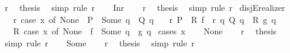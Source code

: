 \begin{isabellebody}
\ r\ \isamarkupfalse%
\ {\isacharquery}{\kern0pt}thesis\ \isamarkupfalse%
\ simp\ {\isacharparenleft}{\kern0pt}rule\ r{}{\isacharparenright}{\kern0pt}\isanewline
{}\isamarkupfalse%
\isanewline
\ \ \isamarkupfalse%
\ Inr\isanewline
\ \ \isamarkupfalse%
\ r\ \isamarkupfalse%
\ {\isacharquery}{\kern0pt}thesis\ \isamarkupfalse%
\ simp\ {\isacharparenleft}{\kern0pt}rule\ r{}{\isacharparenright}{\kern0pt}\isanewline
{}\isamarkupfalse%
%
\endisatagproof
{\isafoldproof}%
%
\isadelimproof
\isanewline
%
\endisadelimproof
\isanewline
{}\isamarkupfalse%
\ disjE{\isacharunderscore}{\kern0pt}realizer{}{\isacharcolon}{\kern0pt}\isanewline
\ \ \ r{\isacharcolon}{\kern0pt}\ {\isachardoublequoteopen}case\ x\ of\ None\ {\isasymRightarrow}\ P\ {\isacharbar}{\kern0pt}\ Some\ q\ {\isasymRightarrow}\ Q\ q{\isachardoublequoteclose}\isanewline
\ \ \ r{}{\isacharcolon}{\kern0pt}\ {\isachardoublequoteopen}P\ {\isasymLongrightarrow}\ R\ f{\isachardoublequoteclose}\ \ r{}{\isacharcolon}{\kern0pt}\ {\isachardoublequoteopen}{\isasymAnd}q{\isachardot}{\kern0pt}\ Q\ q\ {\isasymLongrightarrow}\ R\ {\isacharparenleft}{\kern0pt}g\ q{\isacharparenright}{\kern0pt}{\isachardoublequoteclose}\isanewline
\ \ \ {\isachardoublequoteopen}R\ {\isacharparenleft}{\kern0pt}case\ x\ of\ None\ {\isasymRightarrow}\ f\ {\isacharbar}{\kern0pt}\ Some\ q\ {\isasymRightarrow}\ g\ q{\isacharparenright}{\kern0pt}{\isachardoublequoteclose}\isanewline
%
\isadelimproof
%
\endisadelimproof
%
\isatagproof
{}\isamarkupfalse%
\ {\isacharparenleft}{\kern0pt}cases\ x{\isacharparenright}{\kern0pt}\isanewline
\ \ \isamarkupfalse%
\ None\isanewline
\ \ \isamarkupfalse%
\ r\ \isamarkupfalse%
\ {\isacharquery}{\kern0pt}thesis\ \isamarkupfalse%
\ simp\ {\isacharparenleft}{\kern0pt}rule\ r{}{\isacharparenright}{\kern0pt}\isanewline
{}\isamarkupfalse%
\isanewline
\ \ \isamarkupfalse%
\ Some\isanewline
\ \ \isamarkupfalse%
\ r\ \isamarkupfalse%
\ {\isacharquery}{\kern0pt}thesis\ \isamarkupfalse%
\ simp\ {\isacharparenleft}{\kern0pt}rule\ r{}{\isacharparenright}{\kern0pt}\isanewline
{}\isamarkupfalse%
%
\endisatagproof
{\isafoldproof}%
%
\isadelimproof
\isanewline

\end{isabellebody}
